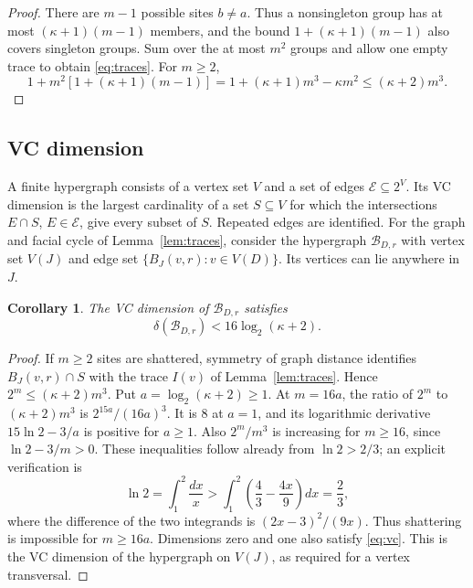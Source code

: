 \documentclass[11pt]{article}
\newtheorem{corollary}[theorem]{Corollary}
\theoremstyle{remark}
\begin{document}
\begin{proof}
There are $m-1$ possible sites $b\ne a$. Thus a nonsingleton group has at
most $(\kappa+1)(m-1)$ members, and the bound
$1+(\kappa+1)(m-1)$ also covers singleton groups. Sum over the at most
$m^2$ groups and allow one empty trace to obtain \eqref{eq:traces}.
For $m\ge2$,
\[
1+m^2[1+(\kappa+1)(m-1)]
 =1+(\kappa+1)m^3-\kappa m^2\le(\kappa+2)m^3.
\]
\end{proof}

\subsection{VC dimension}

A finite hypergraph consists of a vertex set $V$ and a set of edges
$\mathcal E\subseteq2^V$. Its VC dimension is the largest cardinality of a
set $S\subseteq V$ for which the intersections $E\cap S$, $E\in\mathcal E$,
give every subset of $S$. Repeated edges are identified.
For the graph and facial cycle of Lemma~\ref{lem:traces}, consider the
hypergraph $\mathcal B_{D,r}$ with vertex set $V(J)$ and edge set
$\{B_J(v,r):v\in V(D)\}$. Its vertices can lie anywhere in $J$.

\begin{corollary}\label{cor:vc}
The VC dimension of $\mathcal B_{D,r}$ satisfies
\begin{equation}\label{eq:vc}
\delta(\mathcal B_{D,r})<16\log_2(\kappa+2).
\end{equation}
\end{corollary}
\begin{proof}
If $m\ge2$ sites are shattered, symmetry of graph distance identifies
$B_J(v,r)\cap S$ with the trace $I(v)$ of Lemma~\ref{lem:traces}. Hence
$2^m\le(\kappa+2)m^3$. Put $a=\log_2(\kappa+2)\ge1$.
At $m=16a$, the ratio of $2^m$ to $(\kappa+2)m^3$ is
$2^{15a}/(16a)^3$. It is $8$ at $a=1$, and its logarithmic derivative
$15\ln2-3/a$ is positive for $a\ge1$. Also $2^m/m^3$ is increasing for
$m\ge16$, since $\ln2-3/m>0$. These inequalities follow already from
$\ln2>2/3$; an explicit verification is
\begin{equation}\label{eq:ln2}
\ln2=\int_1^2\frac{dx}{x}>
\int_1^2\left(\frac43-\frac{4x}{9}\right)dx=\frac23,
\end{equation}
where the difference of the two integrands is $(2x-3)^2/(9x)$.
Thus shattering is impossible for $m\ge16a$. Dimensions zero and one also
satisfy \eqref{eq:vc}. This is the VC dimension of the hypergraph on $V(J)$,
as required for a vertex transversal.
\end{proof}
\end{document}

